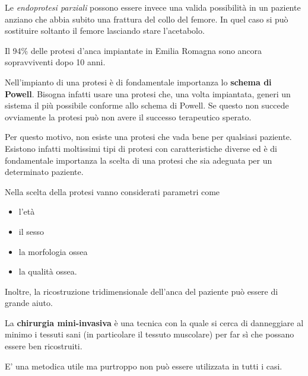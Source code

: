 Le \emph{endoprotesi parziali} possono essere invece una valida possibilità in un paziente anziano che abbia subito una frattura del collo del femore. In quel caso si può sostituire soltanto il femore lasciando stare l'acetabolo.

Il 94\% delle protesi d'anca impiantate in Emilia Romagna sono ancora sopravviventi dopo 10 anni.

Nell'impianto di una protesi è di fondamentale importanza lo \textbf{schema di Powell}. Bisogna infatti usare una protesi che, una volta impiantata, generi un sistema il più possibile conforme allo schema di Powell. Se questo non succede ovviamente la protesi può non avere il successo terapeutico sperato.

Per questo motivo, non esiste una protesi che vada bene per qualsiasi
paziente. Esistono infatti moltissimi tipi di protesi con
caratteristiche diverse ed è di fondamentale importanza la scelta di una
protesi che sia adeguata per un determinato paziente.

Nella scelta della protesi vanno considerati parametri come

\begin{itemize}
\item
  l'età
\item
  il sesso
\item
  la morfologia ossea
\item
  la qualità ossea.
\end{itemize}

Inoltre, la ricostruzione tridimensionale dell'anca del paziente può essere di grande aiuto.

La \textbf{chirurgia mini-invasiva} è una tecnica con la quale si cerca di danneggiare al minimo i tessuti sani (in particolare il tessuto muscolare) per far sì che possano essere ben ricostruiti.

E' una metodica utile ma purtroppo non può essere utilizzata in tutti i casi.
